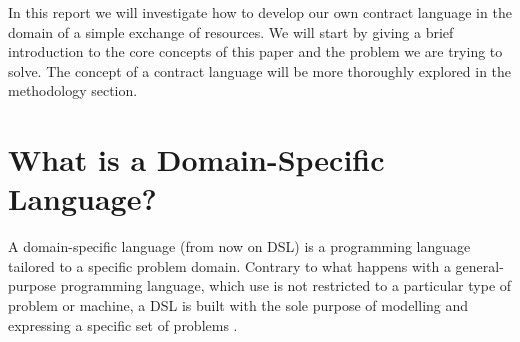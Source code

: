 \documentclass{ituthesis}
\begin{document}

%
In this report we will investigate how to develop our own contract language in the domain of a simple exchange of resources. We will start by giving a brief introduction to the core concepts of this paper and the problem we are trying to solve. The concept of a contract language will be more thoroughly explored in the methodology section.

\section{What is a Domain-Specific Language?}

A domain-specific language (from now on DSL) is a programming language tailored to a specific problem domain. Contrary to what happens with a general-purpose programming language, which use is not restricted to a particular type of problem or machine, a DSL is built with the sole purpose of modelling and expressing a specific set of problems \cite{van2000domain}.
\end{document}
